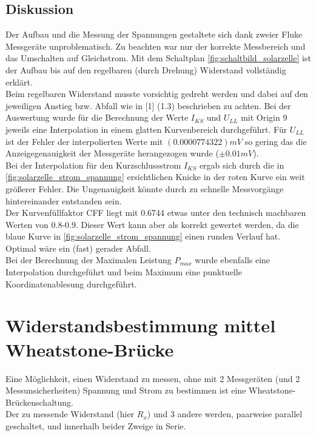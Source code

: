 \documentclass[12pt,a4paper]{article}
\begin{document}
\begin{multicols}{2}

\subsection{Diskussion}
Der Aufbau und  die Messung der Spannungen gestaltete sich dank zweier Fluke Messgeräte unproblematisch. Zu beachten war nur der korrekte Messbereich und das Umschalten auf Gleichstrom. Mit dem Schaltplan \ref{fig:schaltbild_solarzelle} ist der Aufbau bis auf den regelbaren (durch Drehung) Widerstand vollständig erklärt. \\
Beim regelbaren Widerstand musste vorsichtig gedreht werden und dabei auf den jeweiligen Anstieg bzw. Abfall wie in [1] (1.3) beschrieben zu achten. Bei der Auswertung wurde für die Berechnung der Werte $I_{KS}$ und $U_{LL}$ mit Origin 9 jeweils eine Interpolation in einem glatten Kurvenbereich durchgeführt. Für $U_{LL}$ ist der Fehler der interpolierten Werte mit 
$(0.0000774322) mV$ so gering das die Anzeigegenauigkeit der Messgeräte herangezogen wurde ($\pm 0.01mV$).\\
Bei der Interpolation für den Kurzschlussstrom $I_{KS}$ ergab sich durch die in \ref{fig:solarzelle_strom_spannung} ersichtlichen Knicke in der roten Kurve ein weit größerer Fehler. Die Ungenauigkeit könnte durch zu schnelle Messvorgänge hintereinander entstanden sein.\\
Der Kurvenfüllfaktor CFF liegt mit 0.6744 etwas unter den technisch machbaren Werten von 0.8-0.9. Dieser Wert kann aber als korrekt gewertet werden, da die blaue Kurve in \ref{fig:solarzelle_strom_spannung} einen runden Verlauf hat. Optimal wäre ein (fast) gerader Abfall.\\
Bei der Berechnung der Maximalen Leistung $P_{max}$ wurde ebenfalls eine Interpolation durchgeführt und beim Maximum eine punktuelle Koordinatenablesung durchgeführt.\\


\section{Widerstandsbestimmung mittel Wheatstone-Brücke}

Eine Möglichkeit, einen Widerstand zu messen, ohne mit 2 Messgeräten (und 2 Messunsicherheiten) Spannung und Strom zu bestimmen ist eine Wheatstone-Brückenschaltung.
\\
Der zu messende Widerstand (hier $R_x$) und 3 andere werden, paarweise parallel geschaltet, und innerhalb beider Zweige in Serie. 


\end{multicols}
\end{document}
